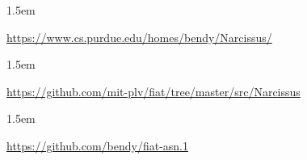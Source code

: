 \documentclass[12pt,twoside]{article}
\begin{document}
\begin{mddefinitions}%


\begin{mdbmarginx}{}{}{}{1.5em}%
\begin{mddefdata}%
\href{https://www.cs.purdue.edu/homes/bendy/Narcissus/}{{\ttfamily https://\hspace{0pt}www.\hspace{0pt}cs.\hspace{0pt}purdue.\hspace{0pt}edu/\hspace{0pt}homes/\hspace{0pt}bendy/\hspace{0pt}Narcissus/\hspace{0pt}}}
\end{mddefdata}%
\end{mdbmarginx}%


\begin{mdbmarginx}{}{}{}{1.5em}%
\begin{mddefdata}%
\href{https://github.com/mit-plv/fiat/tree/master/src/Narcissus}{{\ttfamily https://\hspace{0pt}github.\hspace{0pt}com/\hspace{0pt}mit-\hspace{0pt}plv/\hspace{0pt}fiat/\hspace{0pt}tree/\hspace{0pt}master/\hspace{0pt}src/\hspace{0pt}Narcissus}}
\end{mddefdata}%
\end{mdbmarginx}%

\begin{mdbmarginx}{}{}{}{1.5em}%
\begin{mddefdata}%
\href{https://github.com/bendy/fiat-asn.1}{{\ttfamily https://\hspace{0pt}github.\hspace{0pt}com/\hspace{0pt}bendy/\hspace{0pt}fiat-\hspace{0pt}asn.\hspace{0pt}1}}
\end{mddefdata}%
\end{mdbmarginx}%


\end{mddefinitions}
\end{document}
